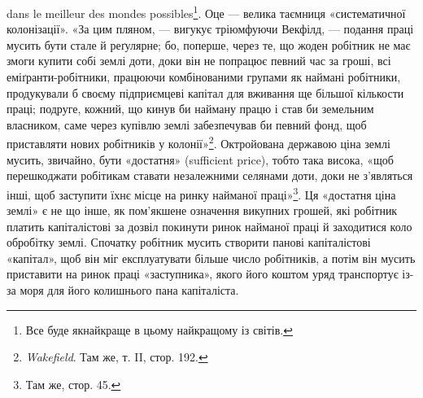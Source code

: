 dans le meilleur des mondes possibles\footnote*{
Все буде якнайкраще в цьому найкращому із світів. }. Оце — велика таємниця «систематичної колонізації». «За цим
пляном, — вигукує тріюмфуючи Векфілд, —
подання праці мусить бути стале й реґулярне; бо, поперше, через те, що жоден робітник не має змоги
купити собі землі доти, доки він не попрацює певний час за гроші, всі еміґранти-робітники, працюючи
комбінованими групами як наймані робітники, продукували б своєму підприємцеві капітал для вживання
ще більшої кількости праці; подруге, кожний, що кинув би найману працю і став би земельним
власником, саме через купівлю землі забезпечував би певний фонд, щоб приставляти
нових робітників у колонії»\footnote{
\emph{Wakefield}. Там же, т. II, стор. 192.
}. Октройована державою ціна землі мусить, звичайно, бути
«достатня» (sufficient price), тобто така висока, «щоб перешкоджати робітикам ставати незалежними
селянами доти, доки не з’являться інші, щоб заступити їхнє місце на ринку найманої праці»\footnote{
Там же, стор. 45.
}. Ця
«достатня ціна землі» є не що інше, як пом’якшене означення викупних грошей, які робітник платить
капіталістові за дозвіл покинути ринок найманої праці й заходитися коло обробітку землі. Спочатку
робітник мусить створити панові капіталістові «капітал», щоб він міг експлуатувати більше число
робітників, а потім він мусить приставити на ринок праці «заступника», якого його коштом уряд
транспортує із-за моря для його колишнього пана капіталіста.

